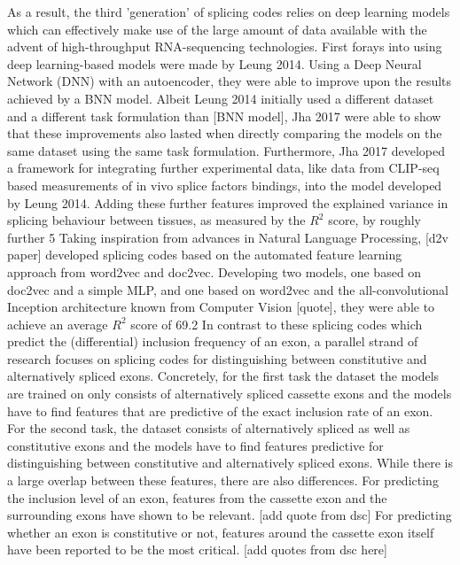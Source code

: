 As a result, the third 'generation' of splicing codes relies on deep learning models which can effectively make use of the large amount of data available with the advent of high-throughput RNA-sequencing technologies. First forays into using deep learning-based models were made by Leung 2014. Using a Deep Neural Network (DNN) with an autoencoder, they were able to improve upon the results achieved by a BNN model. Albeit Leung 2014 initially used a different dataset and a different task formulation than [BNN model], Jha 2017 were able to show that these improvements also lasted when directly comparing the models on the same dataset using the same task formulation. Furthermore, Jha 2017 developed a framework for integrating further experimental data, like data from CLIP-seq based measurements of in vivo splice factors bindings, into the model developed by Leung 2014. Adding these further features improved the explained variance in splicing behaviour between tissues, as measured by the $R^2$ score, by roughly further 5%
Taking inspiration from advances in Natural Language Processing, [d2v paper] developed splicing codes based on the automated feature learning approach from word2vec and doc2vec. Developing two models, one based on doc2vec and a simple MLP, and one based on word2vec and the all-convolutional Inception architecture known from Computer Vision [quote], they were able to achieve an average $R^2$ score of 69.2%
In contrast to these splicing codes which predict the (differential) inclusion frequency of an exon, a parallel strand of research focuses on splicing codes for distinguishing between constitutive and alternatively spliced exons. Concretely, for the first task the dataset the models are trained on only consists of alternatively spliced cassette exons and the models have to find features that are predictive of the exact inclusion rate of an exon.
For the second task, the dataset consists of alternatively spliced as well as constitutive exons and the models have to find features predictive for distinguishing between constitutive and alternatively spliced exons.
While there is a large overlap between these features, there are also differences.
For predicting the inclusion level of an exon, features from the cassette exon and the surrounding exons have shown to be relevant. [add quote from dsc] For predicting whether an exon is constitutive or not, features around the cassette exon itself have been reported to be the most critical. [add quotes from dsc here]
